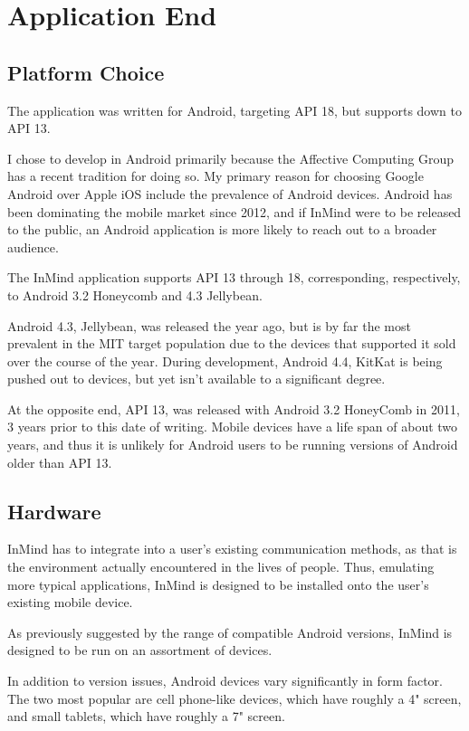   \section{Application End}

    \subsection{Platform Choice}
    The application was written for Android, targeting API 18,
    but supports down to API 13.

    I chose to develop in Android primarily because the Affective Computing Group
    has a recent tradition for doing so.
    My primary reason for choosing Google Android over Apple iOS include
    the prevalence of Android devices.
    Android has been dominating the mobile market since 2012,
    and if InMind were to be released to the public,
    an Android application is more likely to reach out to a broader audience.

    The InMind application supports API 13 through 18, 
    corresponding, respectively, to Android 3.2 Honeycomb and 4.3 Jellybean.

    Android 4.3, Jellybean, was released the year ago, but is by far
    the most prevalent in the MIT target population due to the devices
    that supported it sold over the course of the year.
    During development, Android 4.4, KitKat is being pushed out to devices,
    but yet isn't available to a significant degree.

    At the opposite end, API 13, was released with Android 3.2 HoneyComb
    in 2011, 3 years prior to this date of writing.
    Mobile devices have a life span of about two years,
    and thus it is unlikely for Android users to be
    running versions of Android older than API 13.

    \subsection{Hardware}
    InMind has to integrate into a user's existing communication methods,
    as that is the environment actually encountered in the lives of people.
    Thus, emulating more typical applications,
    InMind is designed to be installed onto the user's existing mobile device.

    As previously suggested by the range of compatible Android versions,
    InMind is designed to be run on an assortment of devices.
    
    In addition to version issues, Android devices vary significantly in form factor.
    The two most popular are cell phone-like devices, which have roughly a 4" screen,
    and small tablets, which have roughly a 7" screen.

